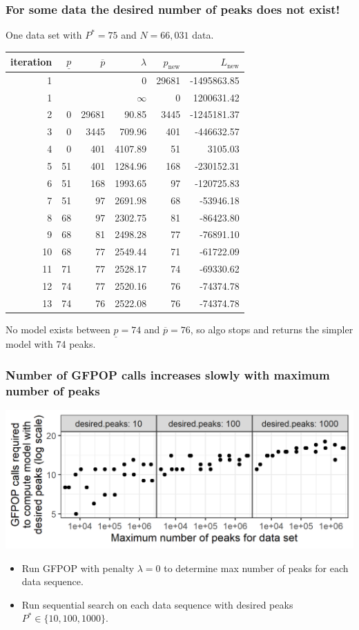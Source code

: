 \documentclass[t]{beamer}
\begin{document}
\begin{frame}
  \frametitle{For some data
 the desired number of peaks does not exist!}

One data set with $P^*=75$ and $N=66,031$ data.

\begin{tabular}{rrrrrr}
\small
 iteration& $\underline p$& $\overline p$&    $\lambda$ & $p_{\text{new}}$& $L_{\text{new}}$\\
  \hline
    1 &  &  & 0 & 29681 & -1495863.85 \\ 
    1 &  &  & $\infty$ &   0 & 1200631.42 \\ 
    2 &   0 & 29681 & 90.85 & 3445 & -1245181.37 \\ 
    3 &   0 & 3445 & 709.96 & 401 & -446632.57 \\ 
    4 &   0 & 401 & 4107.89 &  51 & 3105.03 \\ 
    5 &  51 & 401 & 1284.96 & 168 & -230152.31 \\ 
    6 &  51 & 168 & 1993.65 &  97 & -120725.83 \\ 
    7 &  51 &  97 & 2691.98 &  68 & -53946.18 \\ 
    8 &  68 &  97 & 2302.75 &  81 & -86423.80 \\ 
    9 &  68 &  81 & 2498.28 &  77 & -76891.10 \\ 
   10 &  68 &  77 & 2549.44 &  71 & -61722.09 \\ 
   11 &  71 &  77 & 2528.17 &  74 & -69330.62 \\ 
   12 &  74 &  77 & 2520.16 &  76 & -74374.78 \\ 
   13 &  \alert{74} &  \alert{76} & \alert{2522.08} &  \alert{76} & -74374.78 \\ 
\end{tabular}

\alert{No model exists between $\underline p=74$ and
  $\overline p=76$, so algo stops and returns the simpler model with 74 peaks.}

\end{frame}

\begin{frame}
  \frametitle{Number of GFPOP calls increases slowly with maximum number of peaks}
  \includegraphics[width=\textwidth]{jss-figure-more-evals.png}
  \begin{itemize}
  \item Run GFPOP with penalty $\lambda=0$ to determine max number of
    peaks for each data sequence.
  \item Run sequential search on each data sequence with desired peaks
    $P^*\in\{10,100,1000\}$.
  \end{itemize}

\end{frame}
\end{document}
